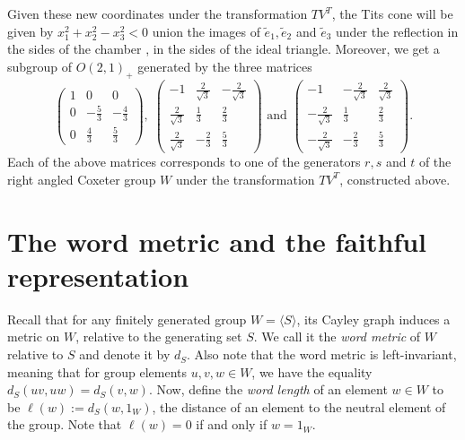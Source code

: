 Given these new coordinates under the transformation \(TV^T\), the Tits cone will be given by \(x_1^2 + x_2^2 - x_3^2 < 0\) union the images of \(\widetilde{e}_1, \widetilde{e}_2\) and \(\widetilde{e}_3\) under the reflection in the sides of the chamber \ie, in the sides of the ideal triangle. %
Moreover, we get a subgroup of \(O(2,1)_+\) generated by the three matrices
\begin{equation*}
    \begin{pmatrix} 1 & 0 & 0 \\ 0 & -\frac{5}{3} & -\frac{4}{3} \\ 0 & \frac{4}{3} & \frac{5}{3} \end{pmatrix},\;
    \begin{pmatrix} -1 & \frac{2}{\sqrt{3}} & -\frac{2}{\sqrt{3}} \\ \frac{2}{\sqrt{3}} & \frac{1}{3} & \frac{2}{3} \\ \frac{2}{\sqrt{3}} & -\frac{2}{3} & \frac{5}{3} \end{pmatrix}
    \text{ and }
    \begin{pmatrix} -1 & -\frac{2}{\sqrt{3}} & \frac{2}{\sqrt{3}} \\ -\frac{2}{\sqrt{3}} & \frac{1}{3} & \frac{2}{3} \\ -\frac{2}{\sqrt{3}} & -\frac{2}{3} & \frac{5}{3} \end{pmatrix}.
\end{equation*}
Each of the above matrices corresponds to one of the generators \(r, s\) and \(t\) of the right angled Coxeter group \(W\) under the transformation \(TV^T\), constructed above.


\section{The word metric and the faithful representation}

Recall that for any finitely generated group \(W = \langle S \rangle\), its Cayley graph induces a metric on \(W\), relative to the generating set \(S\).
We call it the \emph{word metric} of \(W\) relative to \(S\) and denote it by \(d_S\).
Also note that the word metric is left-invariant, meaning that for group elements \(u,v,w\in W\), we have the equality \(d_S(uv,uw) = d_S(v,w)\).
Now, define the \emph{word length} of an element \(w\in W\) to be \(\ell(w) := d_S(w, 1_W)\), the distance of an element to the neutral element of the group.
Note that \(\ell(w) = 0\) if and only if \(w = 1_W\).


